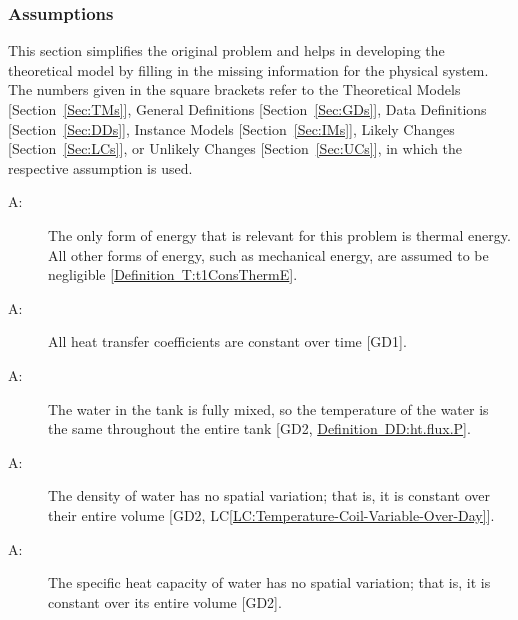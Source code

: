 \documentclass[12pt]{article}
\newcounter{assumpnum}
\newcommand{\atheassumpnum}{A\theassumpnum}
\begin{document}
\subsubsection{Assumptions}
\label{Sec:Assumps}
This section simplifies the original problem and helps in developing the theoretical model by filling in the missing information for the physical system. The numbers given in the square brackets refer to the Theoretical Models {[}Section~\ref{Sec:TMs}{]}, General Definitions {[}Section~\ref{Sec:GDs}{]}, Data Definitions {[}Section~\ref{Sec:DDs}{]}, Instance Models {[}Section~\ref{Sec:IMs}{]}, Likely Changes {[}Section~\ref{Sec:LCs}{]}, or Unlikely Changes {[}Section~\ref{Sec:UCs}{]}, in which the respective assumption is used.
\begin{description}
\item[\atheassumpnum\label{A:Thermal-Energy-Only}:]The only form of energy that is relevant for this problem is thermal energy. All other forms of energy, such as mechanical energy, are assumed to be negligible {[}\hyperref[T:t1ConsThermE]{Definition~T:t1ConsThermE}{]}.
\end{description}
\begin{description}
\item[\atheassumpnum\label{A:Heat-Transfer-Coeffs-Constant}:]All heat transfer coefficients are constant over time {[}GD1{]}.
\end{description}
\begin{description}
\item[\atheassumpnum\label{A:Constant-Water-Temp-Across-Tank}:]The water in the tank is fully mixed, so the temperature of the water is the same throughout the entire tank {[}GD2, \hyperref[DD:ht.flux.P]{Definition~DD:ht.flux.P}{]}.
\end{description}
\begin{description}
\item[\atheassumpnum\label{A:Density-Water-Constant-over-Volume}:]The density of water has no spatial variation; that is, it is constant over their entire volume {[}GD2, LC\ref{LC:Temperature-Coil-Variable-Over-Day}{]}.
\end{description}
\begin{description}
\item[\atheassumpnum\label{A:Specific-Heat-Energy-Constant-over-Volume}:]The specific heat capacity of water has no spatial variation; that is, it is constant over its entire volume {[}GD2{]}.
\end{description}
\end{document}
